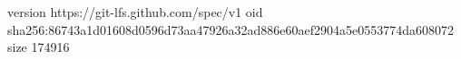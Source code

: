 version https://git-lfs.github.com/spec/v1
oid sha256:86743a1d01608d0596d73aa47926a32ad886e60aef2904a5e0553774da608072
size 174916
